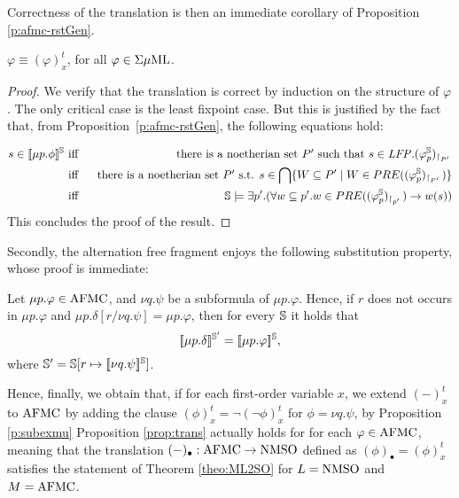 Correctness of the translation is then an immediate corollary of Proposition \ref{p:afmc-rstGen}. 
\begin{proposition}\label{prop:trans} $\varphi \equiv (\varphi)^t_x$, for all $\varphi \in \Sigma\mu\mathrm{ML}$.
\end{proposition}
\begin{proof}
We verify that the translation is correct by induction on the structure of $\varphi$. The only critical case is the least fixpoint case. But this is justified by the fact that, from Proposition~\ref{p:afmc-rstGen}, the following equations hold:

\begin{align*}
s \in \mng{\mu p.\phi}^{\bbS} & \text{ iff } &
\text{ there is a noetherian set $P'$ such that } s \in \LFP. (\varphi^{\model}_{p})_{\rst{P'}} \\
& \text{ iff } &
\text{ there is a noetherian set $P'$ s.t. } s \in \bigcap \{ W \subseteq P'\mid W \in PRE((\varphi^{\model}_{p})_{\rst{P'}})\} \\
& \text{ iff } & \bbS \models \exists p'.(\forall w \subseteq p'. w \in PRE((\varphi^{\model}_{p})_{\rst{p'}}) \to w(s))
\end{align*}
This concludes the proof of the result.
\end{proof}

Secondly, the alternation free fragment enjoys the following substitution property, whose proof is immediate:
\begin{proposition}\label{p:subexmu}
Let $\mu p. \varphi \in \mathrm{AFMC}$, and $\nu q. \psi$ be a subformula of  $\mu p. \varphi$. Hence, if $r$ does not occurs in $\mu p. \varphi$ and $\mu p. \delta[r/ \nu q. \psi] = \mu p. \varphi$, then for every $\mathbb{S}$ it holds that
\[ [\![ \mu p.\delta ]\!]^{\mathbb{S}'} = [\![ \mu p.\varphi ]\!]^{\mathbb{S}}, \]
where $\mathbb{S}'=\mathbb{S}[r \mapsto [\![ \nu q.\psi ]\!]^{\mathbb{S}}]$.
\end{proposition}

Hence, finally, we obtain that, if for each first-order variable $x$, we extend  $(-)^t_x$ to $\mathrm{AFMC}$ by adding the clause $(\phi)_x^t= \lnot ( \lnot \phi)_x^t $ for $\phi=\nu q. \psi $, by Proposition \ref{p:subexmu} Proposition \ref{prop:trans} actually holds for for each $\varphi \in \mathrm{AFMC}$, meaning that the translation $(-)_{\bullet}:\mathrm{AFMC}\to\mathrm{NMSO}$ defined as $(\phi)_{\bullet} = 
(\phi)_x^t $ satisfies the statement of  Theorem \ref{theo:ML2SO}  for $L=\mathrm{NMSO}$ and $M=\mathrm{AFMC}$.



